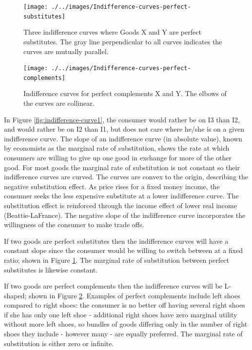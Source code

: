 \documentclass[11pt,]{book}
\theoremstyle{definition}
\theoremstyle{definition}
\theoremstyle{definition}
\theoremstyle{remark}
\begin{document}
\begin{figure}

{\centering \texttt{[image: ./../images/Indifference-curves-perfect-substitutes]} 

}

\caption{Three indifference curves where Goods X and Y are perfect substitutes. The gray line perpendicular to all curves indicates the curves are mutually parallel.}\label{fig:indifference-curve2}
\end{figure}

\begin{figure}

{\centering \texttt{[image: ./../images/Indifference-curves-perfect-complements]} 

}

\caption{Indifference curves for perfect complements X and Y. The elbows of the curves are collinear.}\label{fig:indifference-curve3}
\end{figure}

In Figure \ref{fig:indifference-curve1}, the consumer would rather be on
I3 than I2, and would rather be on I2 than I1, but does not care where
he/she is on a given indifference curve. The slope of an indifference
curve (in absolute value), known by economists as the marginal rate of
substitution, shows the rate at which consumers are willing to give up
one good in exchange for more of the other good. For most goods the
marginal rate of substitution is not constant so their indifference
curves are curved. The curves are convex to the origin, describing the
negative substitution effect. As price rises for a fixed money income,
the consumer seeks the less expensive substitute at a lower indifference
curve. The substitution effect is reinforced through the income effect
of lower real income (Beattie-LaFrance). The negative slope of the
indifference curve incorporates the willingness of the consumer to make
trade offs.

If two goods are perfect substitutes then the indifference curves will
have a constant slope since the consumer would be willing to switch
between at a fixed ratio; shown in Figure \ref{fig:indifference-curve2}.
The marginal rate of substitution between perfect substitutes is
likewise constant.

If two goods are perfect complements then the indifference curves will
be L-shaped; shown in Figure \ref{fig:indifference-curve3}. Examples of
perfect complements include left shoes compared to right shoes: the
consumer is no better off having several right shoes if she has only one
left shoe - additional right shoes have zero marginal utility without
more left shoes, so bundles of goods differing only in the number of
right shoes they include - however many - are equally preferred. The
marginal rate of substitution is either zero or infinite.
\end{document}
